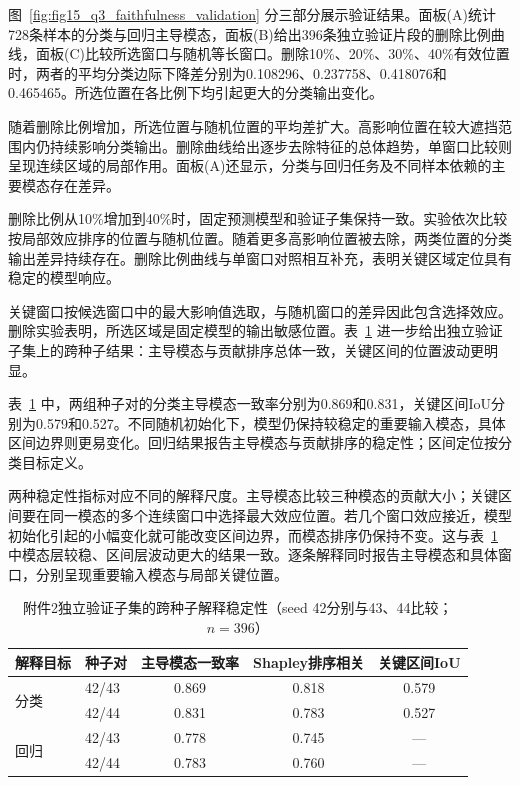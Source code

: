 图~\ref{fig:fig15_q3_faithfulness_validation} 分三部分展示验证结果。面板(A)统计728条样本的分类与回归主导模态，面板(B)给出396条独立验证片段的删除比例曲线，面板(C)比较所选窗口与随机等长窗口。删除10\%、20\%、30\%、40\%有效位置时，两者的平均分类边际下降差分别为0.108296、0.237758、0.418076和0.465465。所选位置在各比例下均引起更大的分类输出变化。

随着删除比例增加，所选位置与随机位置的平均差扩大。高影响位置在较大遮挡范围内仍持续影响分类输出。删除曲线给出逐步去除特征的总体趋势，单窗口比较则呈现连续区域的局部作用。面板(A)还显示，分类与回归任务及不同样本依赖的主要模态存在差异。

删除比例从10\%增加到40\%时，固定预测模型和验证子集保持一致。实验依次比较按局部效应排序的位置与随机位置。随着更多高影响位置被去除，两类位置的分类输出差异持续存在。删除比例曲线与单窗口对照相互补充，表明关键区域定位具有稳定的模型响应。

关键窗口按候选窗口中的最大影响值选取，与随机窗口的差异因此包含选择效应。删除实验表明，所选区域是固定模型的输出敏感位置。表~\ref{tab:q3_seed_stability} 进一步给出独立验证子集上的跨种子结果：主导模态与贡献排序总体一致，关键区间的位置波动更明显。

表~\ref{tab:q3_seed_stability} 中，两组种子对的分类主导模态一致率分别为0.869和0.831，关键区间IoU分别为0.579和0.527。不同随机初始化下，模型仍保持较稳定的重要输入模态，具体区间边界则更易变化。回归结果报告主导模态与贡献排序的稳定性；区间定位按分类目标定义。

两种稳定性指标对应不同的解释尺度。主导模态比较三种模态的贡献大小；关键区间要在同一模态的多个连续窗口中选择最大效应位置。若几个窗口效应接近，模型初始化引起的小幅变化就可能改变区间边界，而模态排序仍保持不变。这与表~\ref{tab:q3_seed_stability} 中模态层较稳、区间层波动更大的结果一致。逐条解释同时报告主导模态和具体窗口，分别呈现重要输入模态与局部关键位置。

\begin{table}[htbp]
\centering\small
\setlength{\tabcolsep}{4pt}
\caption{附件2独立验证子集的跨种子解释稳定性（seed 42分别与43、44比较；$n=396$）}
\label{tab:q3_seed_stability}
\begin{tabular}{@{}llccc@{}}
\toprule
解释目标 & 种子对 & 主导模态一致率 & Shapley排序相关 & 关键区间IoU\\
\midrule
\multirow{2}{*}{分类} & 42/43 & 0.869 & 0.818 & 0.579\\
 & 42/44 & 0.831 & 0.783 & 0.527\\
\multirow{2}{*}{回归} & 42/43 & 0.778 & 0.745 & ---\\
 & 42/44 & 0.783 & 0.760 & ---\\
\bottomrule
\end{tabular}
\par\vspace{2pt}{\footnotesize 分类排序相关仅统计两种子预测类别一致的样本；区间定位按分类目标定义，回归未单独定义关键区间。}
\end{table}

